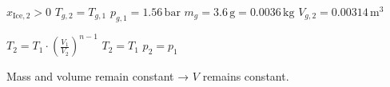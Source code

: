 \( x_{\text{Ice},2} > 0 \)  
\( T_{g,2} = T_{g,1} \)  
\( p_{g,1} = 1.56 \, \text{bar} \)  
\( m_g = 3.6 \, \text{g} = 0.0036 \, \text{kg} \)  
\( V_{g,2} = 0.00314 \, \text{m}^3 \)  

\( T_2 = T_1 \cdot \left( \frac{V_1}{V_2} \right)^{n-1} \)  
\( T_2 = T_1 \)  
\( p_2 = p_1 \)  

Mass and volume remain constant → \( V \) remains constant.